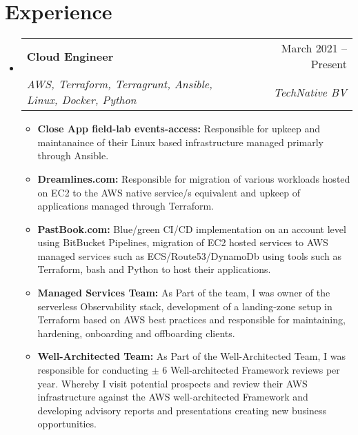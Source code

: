 \documentclass[letterpaper,11pt]{article}
\makeatletter
\newcommand{\resumeItem}[1]{
  \item\small{
    {#1 \vspace{-2pt}}
  }
}
\newcommand{\resumeSubheading}[4]{
  \vspace{-2pt}\item
    \begin{tabular*}{0.97\textwidth}[t]{l@{\extracolsep{\fill}}r}
      \textbf{#1} & #2 \\
      \textit{\small#3} & \textit{\small #4} \\
    \end{tabular*}\vspace{-7pt}
}
\newcommand{\resumeSubSubheading}[2]{
    \item
    \begin{tabular*}{0.97\textwidth}{l@{\extracolsep{\fill}}r}
      \textit{\small#1} & \textit{\small #2} \\
    \end{tabular*}\vspace{-7pt}
}
\newcommand{\resumeSubHeadingListStart}{\begin{itemize}[leftmargin=0.15in, label={}]}
\newcommand{\resumeSubHeadingListEnd}{\end{itemize}}
\newcommand{\resumeItemListStart}{\begin{itemize}}
\newcommand{\resumeItemListEnd}{\end{itemize}\vspace{-5pt}}
\makeatother
\begin{document}

\vspace{0.5cm}
\section{Experience}
  \resumeSubHeadingListStart
    \resumeSubheading
      {Cloud Engineer}{March 2021 -- Present}
      {AWS, Terraform, Terragrunt, Ansible, Linux, Docker, Python}{TechNative BV}
      \resumeItemListStart
        \resumeItem{\textbf{Close App field-lab events-access:} Responsible for upkeep and maintanaince of their Linux based infrastructure managed primarly through Ansible.}{}
        \resumeItem{\textbf{Dreamlines.com:} Responsible for migration of various workloads hosted on EC2 to the AWS native service/s equivalent and upkeep of applications managed through Terraform.}
        \resumeItem{\textbf{PastBook.com:} Blue/green CI/CD implementation on an account level using BitBucket Pipelines, migration of EC2 hosted services to AWS managed services such as ECS/Route53/DynamoDb using tools such as Terraform, bash and Python to host their applications.}
        \resumeItem{\textbf{Managed Services Team:} As Part of the team, I was owner of the serverless Observability stack, development of a landing-zone setup in Terraform based on AWS best practices and responsible for maintaining, hardening, onboarding and offboarding clients.}
        \resumeItem{\textbf{Well-Architected Team:} As Part of the Well-Architected Team, I was responsible for conducting $\pm$ 6 Well-architected Framework reviews per year. Whereby I visit potential prospects and review their AWS infrastructure against the AWS well-architected Framework and developing advisory reports and presentations creating new business opportunities.}
      \resumeItemListEnd
  \resumeSubHeadingListEnd
\end{document}

